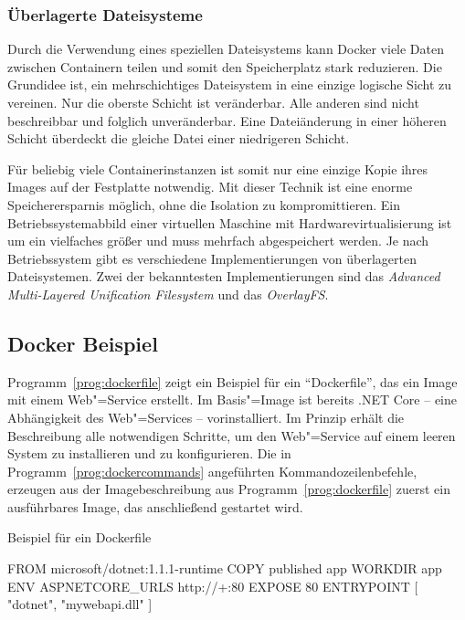 \subsubsection{Überlagerte Dateisysteme}

Durch die Verwendung eines speziellen Dateisystems kann Docker viele Daten zwischen Containern teilen und somit den Speicherplatz stark reduzieren. Die Grundidee ist, ein mehrschichtiges Dateisystem in eine einzige logische Sicht zu vereinen. Nur die oberste Schicht ist veränderbar. Alle anderen sind nicht beschreibbar und folglich unveränderbar. Eine Dateiänderung in einer höheren Schicht überdeckt die gleiche Datei einer niedrigeren Schicht.

Für beliebig viele Containerinstanzen ist somit nur eine einzige Kopie ihres Images auf der Festplatte notwendig. Mit dieser Technik ist eine enorme Speicherersparnis möglich, ohne die Isolation zu kompromittieren. Ein Betriebssystemabbild einer virtuellen Maschine mit Hardwarevirtualisierung ist um ein vielfaches größer und muss mehrfach abgespeichert werden. Je nach Betriebssystem gibt es verschiedene Implementierungen von überlagerten Dateisystemen. Zwei der bekanntesten Implementierungen sind das \textit{Advanced Multi-Layered Unification File\-system} und das \textit{OverlayFS}.

\subsection{Docker Beispiel}

Programm~\ref{prog:dockerfile} zeigt ein Beispiel für ein "`Dockerfile"', das ein Image mit einem Web"=Service erstellt. Im Basis"=Image ist bereits .NET Core -- eine Abhängigkeit des Web"=Services -- vorinstalliert. Im Prinzip erhält die Beschreibung alle notwendigen Schritte, um den Web"=Service auf einem leeren System zu installieren und zu konfigurieren. Die in Programm~\ref{prog:dockercommands} angeführten Kommandozeilenbefehle, erzeugen aus der Imagebeschreibung aus Programm~\ref{prog:dockerfile} zuerst ein ausführbares Image, das anschließend gestartet wird.


\begin{program}[!hbt]
\caption{Beispiel für ein Dockerfile}
\label{prog:dockerfile}
\begin{DockerCode}
FROM microsoft/dotnet:1.1.1-runtime
COPY published app
WORKDIR app
ENV ASPNETCORE_URLS http://+:80 
EXPOSE 80
ENTRYPOINT [ "dotnet", "mywebapi.dll" ]
\end{DockerCode}
\end{program}

